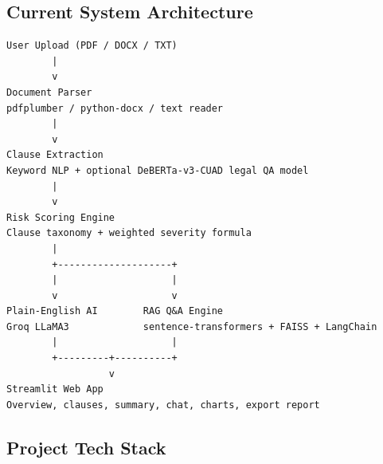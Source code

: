 \documentclass[11pt,a4paper]{article}
\begin{document}
\subsection{Current System Architecture}

\begin{verbatim}
User Upload (PDF / DOCX / TXT)
        |
        v
Document Parser
pdfplumber / python-docx / text reader
        |
        v
Clause Extraction
Keyword NLP + optional DeBERTa-v3-CUAD legal QA model
        |
        v
Risk Scoring Engine
Clause taxonomy + weighted severity formula
        |
        +--------------------+
        |                    |
        v                    v
Plain-English AI        RAG Q&A Engine
Groq LLaMA3             sentence-transformers + FAISS + LangChain
        |                    |
        +---------+----------+
                  v
Streamlit Web App
Overview, clauses, summary, chat, charts, export report
\end{verbatim}

\subsection{Project Tech Stack}
\end{document}
